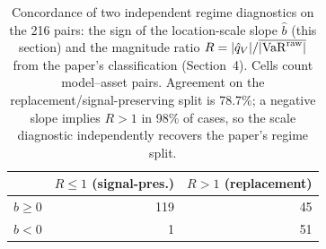 \begin{table}[htbp]
	\centering
	\caption{Concordance of two independent regime diagnostics on the 216 pairs: the sign of the location-scale slope $\hat b$ (this section) and the magnitude ratio $R=|\hat q_V|/\overline{|\mathrm{VaR}^{\mathrm{raw}}|}$ from the paper's classification (Section~4). Cells count model--asset pairs. Agreement on the replacement/signal-preserving split is 78.7\%; a negative slope implies $R>1$ in 98\% of cases, so the scale diagnostic independently recovers the paper's regime split.}
	\label{tab:scale_regime_crosstab}
	\footnotesize
	\begin{tabular}{@{}lrr@{}}
		\hline\hline
		& $R\le1$ (signal-pres.) & $R>1$ (replacement) \\
		\hline
		$\hat b\ge0$ & 119 & 45 \\
		$\hat b<0$ & 1 & 51 \\
		\hline\hline
	\end{tabular}
\end{table}
